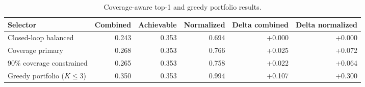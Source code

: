 \begin{table}[tb]
\centering
\caption{Coverage-aware top-1 and greedy portfolio results.}
\label{tab:corrected_coverage_aware_portfolio}
\begin{tabular}{lrrrrr}
\toprule
Selector & Combined & Achievable & Normalized & Delta combined & Delta normalized \\
\midrule
Closed-loop balanced & 0.243 & 0.353 & 0.694 & +0.000 & +0.000 \\
Coverage primary & 0.268 & 0.353 & 0.766 & +0.025 & +0.072 \\
90\% coverage constrained & 0.265 & 0.353 & 0.758 & +0.022 & +0.064 \\
Greedy portfolio ($K\leq3$) & 0.350 & 0.353 & 0.994 & +0.107 & +0.300 \\
\bottomrule
\end{tabular}
\end{table}
